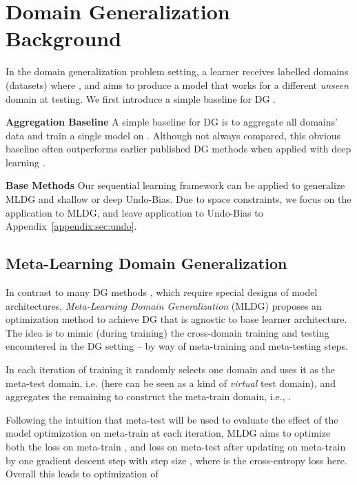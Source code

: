 \documentclass[runningheads]{llncs}
\newcommand{\cut}[1]{}
\newcommand{\keypoint}[1]{\vspace{0.1cm}\noindent\textbf{#1}\quad}
\begin{document}
\section{Domain Generalization Background}\label{sec:bg}
In the domain generalization problem setting, a learner receives  labelled domains (datasets)  where , and aims to produce a model that works for a different \emph{unseen} domain  at testing. \cut{It assumes that the domains are homogeneous (containing corresponding input channels and label spaces).} We first introduce a simple baseline for DG .

\keypoint{Aggregation Baseline} A simple baseline for DG is to aggregate all domains' data and train a single model on . Although not always compared, this obvious baseline often outperforms earlier published DG methods when applied with deep learning \cite{da2017dg}.

\keypoint{Base Methods} Our sequential learning framework can be applied to generalize MLDG \cite{Li2018MLDG} and shallow \cite{ECCV12_Khosla} or deep \cite{da2017dg} Undo-Bias. Due to space constraints, we focus on the application to MLDG, and leave application to Undo-Bias to Appendix~\ref{appendix:sec:undo}. 

\subsection{Meta-Learning Domain Generalization}\label{sec:mldg}
In contrast to many DG methods \cite{ECCV12_Khosla,da2017dg,mmdaaecvpr2018,shiv2018dg}, which require special designs of model architectures, \emph{Meta-Learning Domain Generalization} (MLDG) \cite{Li2018MLDG} proposes an optimization method to achieve DG that is agnostic to base learner architecture. The idea is to mimic (during training) the cross-domain training and testing encountered in the DG setting -- by way of meta-training and meta-testing steps. 

In each iteration of training it randomly selects one domain  and uses it as the meta-test domain, i.e.  (here  can be seen as a kind of \emph{virtual} test domain), and aggregates the remaining to construct the meta-train domain, i.e., .

Following the intuition that meta-test will be used to evaluate the effect of the model optimization on meta-train at each iteration, MLDG aims to optimize both the loss on meta-train  , and loss on meta-test after updating on meta-train  by one gradient descent step   with step size , where  is the cross-entropy loss here. Overall this leads to optimization of
\end{document}

